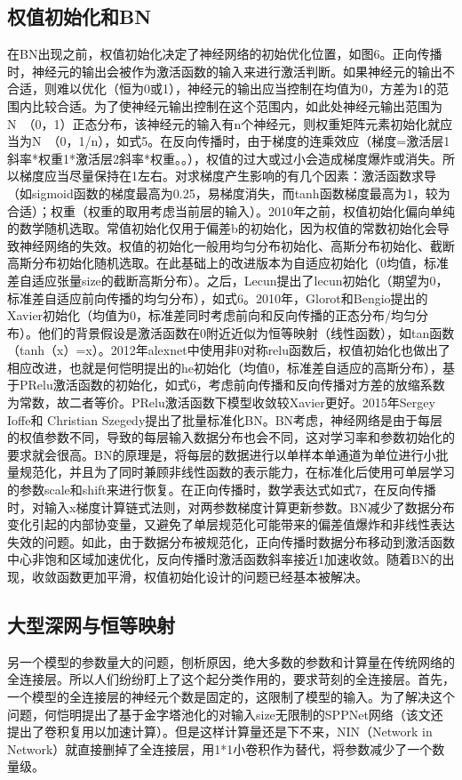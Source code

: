 \documentclass[15pt]{article}
\begin{document}
\subsection{权值初始化和BN}
在BN出现之前，权值初始化决定了神经网络的初始优化位置，如图6。正向传播时，神经元的输出会被作为激活函数的输入来进行激活判断。如果神经元的输出不合适，则难以优化（恒为0或1），神经元的输出应当控制在均值为0，方差为1的范围内比较合适。为了使神经元输出控制在这个范围内，如此处神经元输出范围为N~（0，1）正态分布，该神经元的输入有n个神经元，则权重矩阵元素初始化就应当为N~（0，1/n），如式5。在反向传播时，由于梯度的连乘效应（梯度=激活层1斜率*权重1*激活层2斜率*权重。。），权值的过大或过小会造成梯度爆炸或消失。所以梯度应当尽量保持在1左右。对求梯度产生影响的有几个因素：激活函数求导（如sigmoid函数的梯度最高为0.25，易梯度消失，而tanh函数梯度最高为1，较为合适）；权重（权重的取用考虑当前层的输入）。2010年之前，权值初始化偏向单纯的数学随机选取。常值初始化仅用于偏差b的初始化，因为权值的常数初始化会导致神经网络的失效。权值的初始化一般用均匀分布初始化、高斯分布初始化、截断高斯分布初始化随机选取。在此基础上的改进版本为自适应初始化（0均值，标准差自适应张量size的截断高斯分布）。之后，Lecun提出了lecun初始化（期望为0，标准差自适应前向传播的均匀分布）\cite{ref48}，如式6。2010年，Glorot和Bengio提出的Xavier初始化（均值为0，标准差同时考虑前向和反向传播的正态分布/均匀分布）\cite{ref49}。他们的背景假设是激活函数在0附近近似为恒等映射（线性函数），如tan函数（tanh（x）=x）。2012年alexnet中使用非0对称relu函数后，权值初始化也做出了相应改进，也就是何恺明提出的he初始化（均值0，标准差自适应的高斯分布）\cite{ref47}，基于PRelu激活函数的初始化，如式6，考虑前向传播和反向传播对方差的放缩系数为常数，故二者等价。PRelu激活函数下模型收敛较Xavier更好。2015年Sergey Ioffe和 Christian Szegedy提出了批量标准化BN。BN考虑，神经网络是由于每层的权值参数不同，导致的每层输入数据分布也会不同，这对学习率和参数初始化的要求就会很高。BN的原理是，将每层的数据进行以单样本单通道为单位进行小批量规范化，并且为了同时兼顾非线性函数的表示能力，在标准化后使用可单层学习的参数scale和shift来进行恢复\cite{ref41}。在正向传播时，数学表达式如式7，在反向传播时，对输入x梯度计算链式法则，对两参数梯度计算更新参数。BN减少了数据分布变化引起的内部协变量，又避免了单层规范化可能带来的偏差值爆炸和非线性表达失效的问题。如此，由于数据分布被规范化，正向传播时数据分布移动到激活函数中心非饱和区域加速优化，反向传播时激活函数斜率接近1加速收敛。随着BN的出现，收敛函数更加平滑，权值初始化设计的问题已经基本被解决。

\subsection{大型深网与恒等映射}
另一个模型的参数量大的问题，刨析原因，绝大多数的参数和计算量在传统网络的全连接层。所以人们纷纷盯上了这个起分类作用的，要求苛刻的全连接层。首先，一个模型的全连接层的神经元个数是固定的，这限制了模型的输入。为了解决这个问题，何恺明提出了基于金字塔池化的对输入size无限制的SPPNet网络（该文还提出了卷积复用以加速计算）\cite{ref50}。但是这样计算量还是下不来，NIN（Network in Network）就直接删掉了全连接层，用1*1小卷积作为替代，将参数减少了一个数量级\cite{ref51}。
\end{document}
